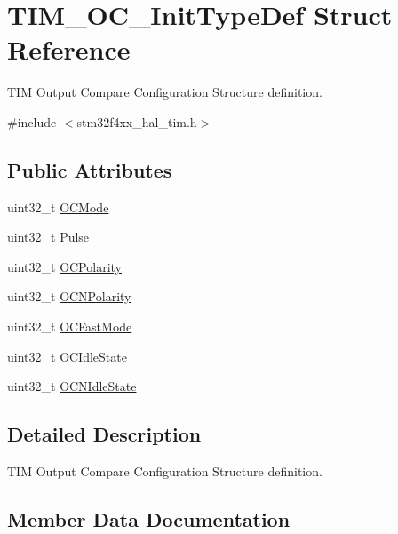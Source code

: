 \hypertarget{struct_t_i_m___o_c___init_type_def}{}\section{T\+I\+M\+\_\+\+O\+C\+\_\+\+Init\+Type\+Def Struct Reference}
\label{struct_t_i_m___o_c___init_type_def}


T\+IM Output Compare Configuration Structure definition.  




{\ttfamily \#include $<$stm32f4xx\+\_\+hal\+\_\+tim.\+h$>$}

\subsection*{Public Attributes}
\begin{DoxyCompactItemize}
\item 
uint32\+\_\+t \hyperlink{struct_t_i_m___o_c___init_type_def_ae5faa1cba0b3f1ab6179cc54e1015ee8}{O\+C\+Mode}
\item 
uint32\+\_\+t \hyperlink{struct_t_i_m___o_c___init_type_def_a61fb5b9ef4154de67620ac81085a0e39}{Pulse}
\item 
uint32\+\_\+t \hyperlink{struct_t_i_m___o_c___init_type_def_a556b7137d041aceed3e45c87cbfb39cd}{O\+C\+Polarity}
\item 
uint32\+\_\+t \hyperlink{struct_t_i_m___o_c___init_type_def_a21922d8e2fee659d081c4be4c500d1d4}{O\+C\+N\+Polarity}
\item 
uint32\+\_\+t \hyperlink{struct_t_i_m___o_c___init_type_def_a4c4203c5ed779ac86fb793bb9d628e55}{O\+C\+Fast\+Mode}
\item 
uint32\+\_\+t \hyperlink{struct_t_i_m___o_c___init_type_def_ace3e2b76ca2fca0f4961585ed9ebecf5}{O\+C\+Idle\+State}
\item 
uint32\+\_\+t \hyperlink{struct_t_i_m___o_c___init_type_def_a0d70cc51990d7433fd76cc6ed1d06237}{O\+C\+N\+Idle\+State}
\end{DoxyCompactItemize}


\subsection{Detailed Description}
T\+IM Output Compare Configuration Structure definition. 

\subsection{Member Data Documentation}
